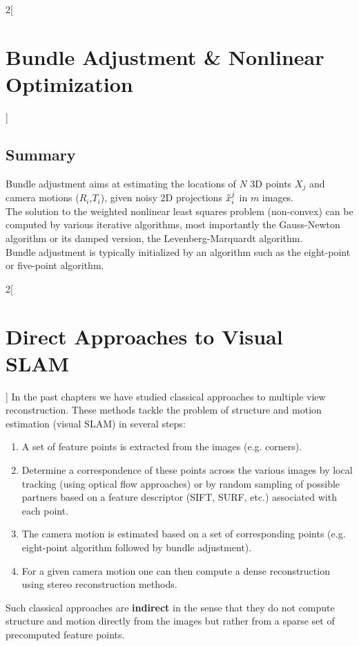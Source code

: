 \documentclass[oneside,fontsize=11pt,paper=a4]{scrartcl}
\begin{document}
\begin{multicols}{2}[\section{Bundle Adjustment \& Nonlinear Optimization}]
\subsection{Summary}
Bundle adjustment aims at estimating the locations of $N$ 3D points $X_j$ and camera motions ($R_i$,$T_i$), given noisy 2D projections $\Tilde{x}_i^j$ in $m$ images.\\
The solution to the weighted nonlinear least squares problem (non-convex) can be computed by various iterative algorithms, most importantly the Gauss-Newton algorithm or its damped version, the Levenberg-Marquardt algorithm.\\
Bundle adjustment is typically initialized by an algorithm such as the eight-point or five-point algorithm.
\end{multicols}

\begin{multicols}{2}[\section{Direct Approaches to Visual SLAM}]
In the past chapters we have studied classical approaches to multiple view reconstruction.
These methods tackle the problem of structure and motion estimation (visual SLAM) in several steps:
\begin{enumerate}
    \item A set of feature points is extracted from the images (e.g. corners).
    \item Determine a correspondence of these points across the various images by local tracking (using optical flow approaches) or by random sampling of possible partners based on a feature descriptor (SIFT, SURF, etc.) associated with each point.
    \item The camera motion is estimated based on a set of corresponding points (e.g. eight-point algorithm followed by bundle adjustment).
    \item For a given camera motion one can then compute a dense reconstruction using stereo reconstruction methods.
\end{enumerate}

Such classical approaches are \textbf{indirect} in the sense that they do not compute structure and motion directly from the images but rather from a sparse set of precomputed feature points.\\
\vspace{3mm}


\end{multicols}
\end{document}

